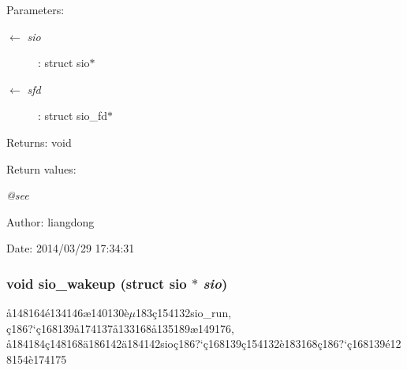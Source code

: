 \begin{Desc}
\item[Parameters:]
\begin{description}
\item[\mbox{$\leftarrow$} {\em sio}]: struct sio$\ast$ \item[\mbox{$\leftarrow$} {\em sfd}]: struct sio\_\-fd$\ast$ \end{description}
\end{Desc}
\begin{Desc}
\item[Returns:]void \end{Desc}
\begin{Desc}
\item[Return values:]
\begin{description}
\item[{\em @see}]\end{description}
\end{Desc}
\begin{Desc}
\item[Author:]liangdong \end{Desc}
\begin{Desc}
\item[Date:]2014/03/29 17:34:31 \end{Desc}
\subsubsection{\setlength{\rightskip}{0pt plus 5cm}void sio\_\-wakeup (struct sio $\ast$ {\em sio})}\label{sio_8h_a14}


\aa{}148164\'{e}134146\ae{}140130\`{e}$\mu$183\c{c}154132sio\_\-run, \c{c}186?`\c{c}168139\aa{}174137\aa{}133168\aa{}135189\ae{}149176, \aa{}184184\c{c}148168\"{a}186142\"{a}184142sio\c{c}186?`\c{c}168139\c{c}154132\`{e}183168\c{c}186?`\c{c}168139\'{e}128154\`{e}174175 

